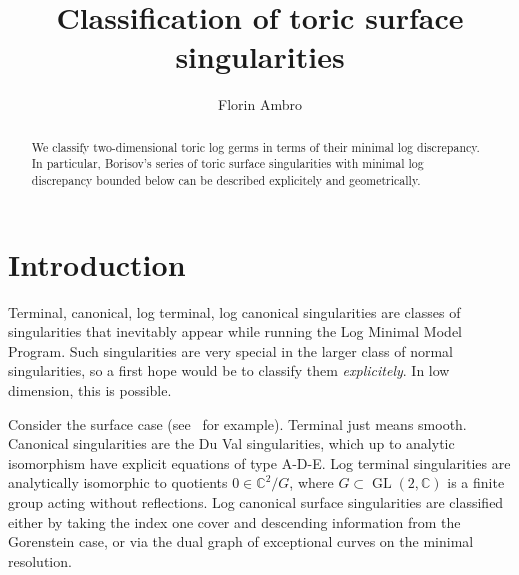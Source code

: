\documentclass[12pt,reqno]{amsart}
\author{Florin Ambro}
\newcommand{\bC}{{\mathbb C}} %
\newcommand{\GL}{\operatorname{GL}}
\theoremstyle{plain}
\theoremstyle{definition}
\theoremstyle{remark}
\begin{document}

\title[Classification]
{Classification of toric surface singularities}
\maketitle


\begin{abstract} 
We classify two-dimensional toric log germs in terms of their minimal log discrepancy. 
In particular, Borisov's series of toric surface singularities with minimal log discrepancy 
bounded below can be described explicitely and geometrically.
\end{abstract}






\section{Introduction}


Terminal, canonical, log terminal, log canonical singularities are classes of singularities that inevitably appear while running the Log Minimal Model Program. Such singularities are very special in the larger class of normal singularities, so a first hope would be to classify them {\em explicitely}. In low dimension, this is possible.

Consider the surface case (see~\cite{Mat02} for example). Terminal just means smooth. Canonical singularities are the Du Val singularities, which up to analytic isomorphism have explicit equations of type A-D-E.
Log terminal singularities are analytically isomorphic to quotients $0\in \bC^2/G$, where $G\subset \GL(2,\bC)$ is a finite group acting without reflections. Log canonical surface singularities are classified either by taking the index one cover and descending information from the Gorenstein case, or via the dual graph of exceptional curves on the minimal resolution.
\end{document}
